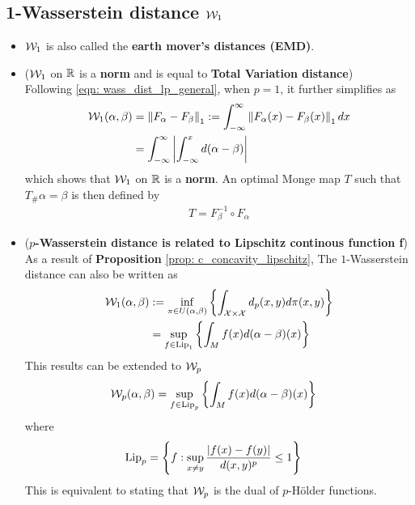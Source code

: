 \documentclass[11pt]{article}
\begin{document}
\subsection{1-Wasserstein distance ${\mathcal W}_1$}
\begin{itemize}
\item ${\mathcal W}_1$ is also called the \textbf{earth mover’s distances (EMD)}.

\item (${\mathcal W}_1$ on ${\mathbb R}$ is a \textbf{norm} and is equal to \textbf{Total Variation distance})\\

Following \eqref{eqn: wass_dist_lp_general}, when $p=1$, it further simplifies as 
\begin{align}
{\mathcal W}_{1}(\alpha, \beta) &=  \left\|F_{\alpha} - F_{\beta}\right\|_{1} := \int_{-\infty}^{\infty}\left\|F_{\alpha}(x) - F_{\beta}(x)\right\|_{1} dx  \label{eqn: wass_dist_l1_general}\\
&=  \int_{-\infty}^{\infty}\left\lvert \int_{-\infty}^{x}d(\alpha - \beta)  \right\rvert \label{eqn: wass_dist_l1_general_tv0}
\end{align} which shows that ${\mathcal W}_1$ on ${\mathbb R}$ is a \textbf{norm}. An optimal Monge map $T$ such that $T_{\#}\alpha = \beta$ is then defined by
\begin{align}
T = F_{\beta}^{-1} \circ  F_{\alpha}    \label{eqn: wass_dist_l1_general_optimal_map}
\end{align}

\item (\textbf{$p$-Wasserstein distance is related to Lipschitz continous function f})\\
As a result of \textbf{Proposition} \ref{prop: c_concavity_lipschitz}, The $1$-Wasserstein distance can also be written as 
\begin{align}
{\mathcal W}_{1}(\alpha, \beta) &:= \inf_{\pi \in U(\alpha, \beta)}\left\{\int_{{\mathcal X} \times {\mathcal X}}d_{p}(x,y) d\pi(x, y)\right\} \nonumber\\
&= \sup_{f \in \text{Lip}_1}\left\{\int_{M} f(x) d(\alpha - \beta)(x) \right\}  \label{eqn: wass_dist_c_transform_lip1}
\end{align} This results can be extended to ${\mathcal W}_{p}$
\begin{align}
{\mathcal W}_{p}(\alpha, \beta) &= \sup_{f \in \text{Lip}_p}\left\{\int_{M} f(x) d(\alpha - \beta)(x) \right\}  \label{eqn: wass_dist_p_lip}
\end{align} where 
\begin{align*}
 \text{Lip}_p &= \left\{f: \sup_{x\neq y} \frac{\left\lvert f(x) - f(y) \right\rvert}{d(x, y)^{p}} \le 1\right\}
\end{align*} This is equivalent to stating that ${\mathcal W}_{p}$ is the dual of $p$-H\"older functions. 


\end{itemize}
\end{document}
